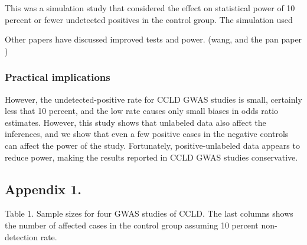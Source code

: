 \documentclass[
]{article}
\begin{document}
This was a simulation study that considered the effect on statistical
power of 10 percent or fewer undetected positives in the control group.
The simulation used

Other papers have discussed improved tests and power. (wang, and the pan
paper )

\hypertarget{practical-implications}{%
\subsubsection{Practical implications}\label{practical-implications}}

However, the undetected-positive rate for CCLD GWAS studies is small,
certainly less that 10 percent, and the low rate causes only small
biases in odds ratio estimates. However, this study shows that unlabeled
data also affect the inferences, and we show that even a few positive
cases in the negative controls can affect the power of the study.
Fortunately, positive-unlabeled data appears to reduce power, making the
results reported in CCLD GWAS studies conservative.

\nocite {wr07}




\hypertarget{appendix-1.}{%
\subsection{Appendix 1.}\label{appendix-1.}}

Table 1. Sample sizes for four GWAS studies of CCLD. The last columns
shows the number of affected cases in the control group assuming 10
percent non-detection rate.
\end{document}
